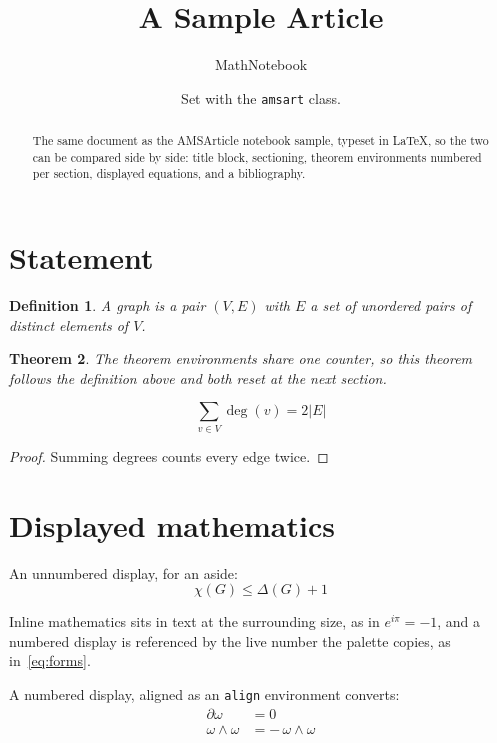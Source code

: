 \documentclass[11pt]{amsart}
\title{A Sample Article}
\author{MathNotebook}
\date{Set with the \texttt{amsart} class.}
\newtheorem{theorem}{Theorem}[section]
\newtheorem{definition}[theorem]{Definition}
\theoremstyle{remark}
\begin{document}
\begin{abstract}
The same document as the AMSArticle notebook sample, typeset in LaTeX, so the
two can be compared side by side: title block, sectioning, theorem environments
numbered per section, displayed equations, and a bibliography.
\end{abstract}

\maketitle

\section{Statement}

\begin{definition}
A graph is a pair $(V,E)$ with $E$ a set of unordered pairs of distinct elements of $V$.
\end{definition}

\begin{theorem}
The theorem environments share one counter, so this theorem follows the definition
above and both reset at the next section.
\end{theorem}

\begin{equation}
  \sum_{v \in V} \deg(v) = 2\lvert E \rvert
\end{equation}

\begin{proof}
Summing degrees counts every edge twice.
\end{proof}

\section{Displayed mathematics}

An unnumbered display, for an aside:
\[
  \chi(G) \le \Delta(G) + 1
\]

Inline mathematics sits in text at the surrounding size, as in $e^{i\pi} = -1$, and a
numbered display is referenced by the live number the palette copies, as in~\eqref{eq:forms}.

A numbered display, aligned as an \texttt{align} environment converts:
\begin{align}
  \partial \omega &= 0 \label{eq:forms} \\
  \omega \wedge \omega &= -\, \omega \wedge \omega
\end{align}
\end{document}
